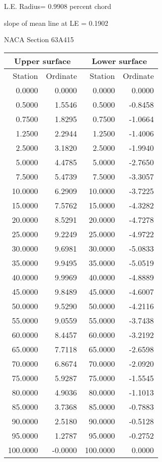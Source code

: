 \documentclass[11pt]{book}
\begin{document}
L.E. Radius=  0.9908 percent chord


 slope of mean line at LE =  0.1902
 \newpage
  \label{s63A415}
 \begin{Large}
 NACA Section 63A415
 \end{Large}
  
 \vspace{8mm}
 \begin{tabular}{|r|r|r|r|} \hline 
 \multicolumn{2}{|c|}{Upper surface} & \multicolumn{2}{|c|}{Lower surface} \\
 \hline
 Station & Ordinate & Station & Ordinate \\
 \hline
0.0000 & 0.0000 & 0.0000 & 0.0000 \\
0.5000 & 1.5546 & 0.5000 & -0.8458 \\
0.7500 & 1.8295 & 0.7500 & -1.0664 \\
1.2500 & 2.2944 & 1.2500 & -1.4006 \\
2.5000 & 3.1820 & 2.5000 & -1.9940 \\
5.0000 & 4.4785 & 5.0000 & -2.7650 \\
7.5000 & 5.4739 & 7.5000 & -3.3057 \\
10.0000 & 6.2909 & 10.0000 & -3.7225 \\
15.0000 & 7.5762 & 15.0000 & -4.3282 \\
20.0000 & 8.5291 & 20.0000 & -4.7278 \\
25.0000 & 9.2249 & 25.0000 & -4.9722 \\
30.0000 & 9.6981 & 30.0000 & -5.0833 \\
35.0000 & 9.9495 & 35.0000 & -5.0519 \\
40.0000 & 9.9969 & 40.0000 & -4.8889 \\
45.0000 & 9.8489 & 45.0000 & -4.6007 \\
50.0000 & 9.5290 & 50.0000 & -4.2116 \\
55.0000 & 9.0559 & 55.0000 & -3.7438 \\
60.0000 & 8.4457 & 60.0000 & -3.2192 \\
65.0000 & 7.7118 & 65.0000 & -2.6598 \\
70.0000 & 6.8674 & 70.0000 & -2.0920 \\
75.0000 & 5.9287 & 75.0000 & -1.5545 \\
80.0000 & 4.9036 & 80.0000 & -1.1013 \\
85.0000 & 3.7368 & 85.0000 & -0.7883 \\
90.0000 & 2.5180 & 90.0000 & -0.5128 \\
95.0000 & 1.2787 & 95.0000 & -0.2752 \\
100.0000 & -0.0000 & 100.0000 & 0.0000 \\
 \hline 
 \end{tabular}
\end{document}

